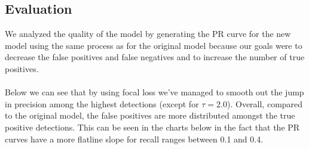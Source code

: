 \documentclass[letter]{article}
\begin{document}
	\subsection{Evaluation}
	We analyzed the quality of the model by generating the PR curve for the new model using the same process as for the original model because our goals were to decrease the false positives and false negatives and to increase the number of true positives.\\\\
	Below we can see that by using focal loss we've managed to smooth out the jump in precision among the highest detections (except for $\tau=2.0$). Overall, compared to the original model, the false positives are more distributed amongst the true positive detections. This can be seen in the charts below in the fact that the PR curves have a more flatline slope for recall ranges between 0.1 and 0.4.
\end{document}
